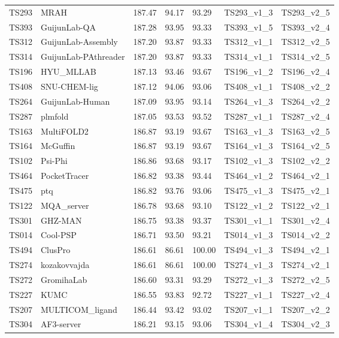 \begin{longtable}{lllllll}
TS293 & MRAH & 187.47 & 94.17 & 93.29 & TS293\_v1\_3 & TS293\_v2\_5 \\ 
TS393 & GuijunLab-QA & 187.28 & 93.95 & 93.33 & TS393\_v1\_5 & TS393\_v2\_4 \\ 
TS312 & GuijunLab-Assembly & 187.20 & 93.87 & 93.33 & TS312\_v1\_1 & TS312\_v2\_5 \\ 
TS314 & GuijunLab-PAthreader & 187.20 & 93.87 & 93.33 & TS314\_v1\_1 & TS314\_v2\_5 \\ 
TS196 & HYU\_MLLAB & 187.13 & 93.46 & 93.67 & TS196\_v1\_2 & TS196\_v2\_4 \\ 
TS408 & SNU-CHEM-lig & 187.12 & 94.06 & 93.06 & TS408\_v1\_1 & TS408\_v2\_2 \\ 
TS264 & GuijunLab-Human & 187.09 & 93.95 & 93.14 & TS264\_v1\_3 & TS264\_v2\_2 \\ 
TS287 & plmfold & 187.05 & 93.53 & 93.52 & TS287\_v1\_1 & TS287\_v2\_4 \\ 
TS163 & MultiFOLD2 & 186.87 & 93.19 & 93.67 & TS163\_v1\_3 & TS163\_v2\_5 \\ 
TS164 & McGuffin & 186.87 & 93.19 & 93.67 & TS164\_v1\_3 & TS164\_v2\_5 \\ 
TS102 & Psi-Phi & 186.86 & 93.68 & 93.17 & TS102\_v1\_3 & TS102\_v2\_2 \\ 
TS464 & PocketTracer & 186.82 & 93.38 & 93.44 & TS464\_v1\_2 & TS464\_v2\_1 \\ 
TS475 & ptq & 186.82 & 93.76 & 93.06 & TS475\_v1\_3 & TS475\_v2\_1 \\ 
TS122 & MQA\_server & 186.78 & 93.68 & 93.10 & TS122\_v1\_2 & TS122\_v2\_1 \\ 
TS301 & GHZ-MAN & 186.75 & 93.38 & 93.37 & TS301\_v1\_1 & TS301\_v2\_4 \\ 
TS014 & Cool-PSP & 186.71 & 93.50 & 93.21 & TS014\_v1\_3 & TS014\_v2\_2 \\ 
TS494 & ClusPro & 186.61 & 86.61 & 100.00 & TS494\_v1\_3 & TS494\_v2\_1 \\ 
TS274 & kozakovvajda & 186.61 & 86.61 & 100.00 & TS274\_v1\_3 & TS274\_v2\_1 \\ 
TS272 & GromihaLab & 186.60 & 93.31 & 93.29 & TS272\_v1\_3 & TS272\_v2\_5 \\ 
TS227 & KUMC & 186.55 & 93.83 & 92.72 & TS227\_v1\_1 & TS227\_v2\_4 \\ 
TS207 & MULTICOM\_ligand & 186.44 & 93.42 & 93.02 & TS207\_v1\_1 & TS207\_v2\_2 \\ 
TS304 & AF3-server & 186.21 & 93.15 & 93.06 & TS304\_v1\_4 & TS304\_v2\_3 \\ 

\end{longtable}
